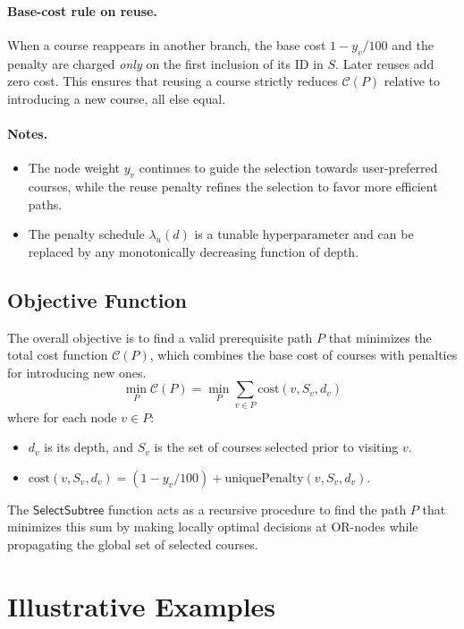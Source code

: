 \documentclass[11pt]{article}
\begin{document}
\paragraph{Base-cost rule on reuse.} When a course reappears in another branch, the base cost $1-y_v/100$ and the penalty are charged \emph{only} on the first inclusion of its ID in $S$. Later reuses add zero cost. This ensures that reusing a course strictly reduces $\mathcal{C}(P)$ relative to introducing a new course, all else equal.

\paragraph{Notes.}
\begin{itemize}
  \item The node weight $y_v$ continues to guide the selection towards user-preferred courses, while the reuse penalty refines the selection to favor more efficient paths.
  \item The penalty schedule $\lambda_u(d)$ is a tunable hyperparameter and can be replaced by any monotonically decreasing function of depth.
\end{itemize}

\subsection{Objective Function}

The overall objective is to find a valid prerequisite path $P$ that minimizes the total cost function $\mathcal{C}(P)$, which combines the base cost of courses with penalties for introducing new ones.
\[
\min_{P} \mathcal{C}(P) = \min_{P} \sum_{v \in P} \text{cost}(v, S_v, d_v)
\]
where for each node $v \in P$:
\begin{itemize}
    \item $d_v$ is its depth, and $S_v$ is the set of courses selected prior to visiting $v$.
    \item $\text{cost}(v, S_v, d_v) = (1 - y_v/100) + \text{uniquePenalty}(v, S_v, d_v)$.
\end{itemize}
The $\mathsf{SelectSubtree}$ function acts as a recursive procedure to find the path $P$ that minimizes this sum by making locally optimal decisions at OR-nodes while propagating the global set of selected courses.

\section{Illustrative Examples}
\end{document}
